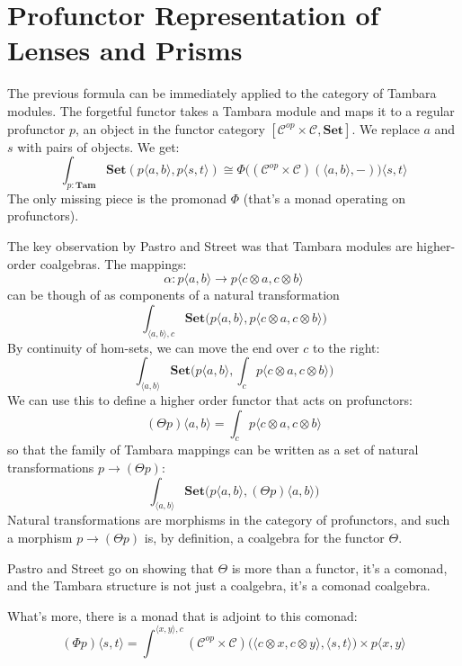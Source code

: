 \documentclass[11pt]{amsart}
\begin{document}
\section{Profunctor Representation of Lenses and Prisms}
The previous formula can be immediately applied to the category of Tambara modules. The forgetful functor takes a Tambara module and maps it to a regular profunctor $p$, an object in the functor category $[\mathcal{C}^{op} \times \mathcal{C}, \mathbf{Set}]$. We replace $a$ and $s$ with pairs of objects. We get:
\[ \int_{p \colon \mathbf{Tam}} \mathbf{Set}(p \langle a, b \rangle, p \langle s, t \rangle) \cong \Phi \big( (\mathcal{C}^{op} \times \mathcal{C})(\langle a, b \rangle, -) \big) \langle s, t \rangle\]
The only missing piece is the promonad $\Phi$ (that's a monad operating on profunctors).

The key observation by Pastro and Street was that Tambara modules are higher-order coalgebras. The mappings:
\[ \alpha \colon p \langle a, b \rangle \to p\langle c \otimes a, c \otimes b \rangle \]
can be though of as components of a natural transformation
\[ \int_{\langle a, b \rangle, c} \mathbf{Set} \big( p \langle a, b \rangle, p\langle c \otimes a, c \otimes b \rangle \big) \]
By continuity of hom-sets, we can move the end over $c$ to the right:
\[ \int_{\langle a, b \rangle} \mathbf{Set} \Big( p \langle a, b \rangle, \int_c p\langle c \otimes a, c \otimes b \rangle \Big) \]
We can use this to define a higher order functor that acts on profunctors:
\[ (\Theta p)\langle a, b \rangle =  \int_c p\langle c \otimes a, c \otimes b \rangle \]
so that the family of Tambara mappings can be written as a set of natural transformations $p \to (\Theta p)$:
\[ \int_{\langle a, b \rangle} \mathbf{Set} \big( p \langle a, b \rangle, (\Theta p)\langle a, b \rangle \big) \]
Natural transformations are morphisms in the category of profunctors, and such a morphism $p \to (\Theta p)$ is, by definition, a coalgebra for the functor $\Theta$.

Pastro and Street go on showing that $\Theta$ is more than a functor, it's a comonad, and the Tambara structure is not just a coalgebra, it's a comonad coalgebra. 

What's more, there is a monad that is adjoint to this comonad:
\[ (\Phi p) \langle s, t \rangle = \int^{\langle x, y \rangle, c} (\mathcal{C}^{op} \times \mathcal{C})\big(\langle c \otimes x, c \otimes y \rangle, \langle s, t \rangle \big) \times p \langle x, y \rangle\]
\end{document}
